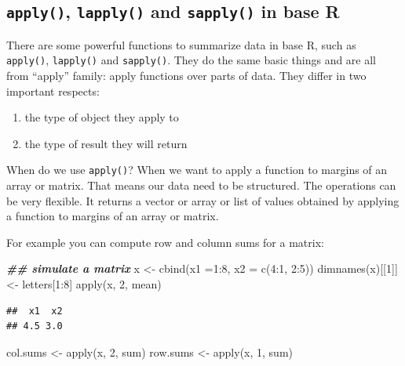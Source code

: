 \documentclass[
  12pt,
]{krantz}
\makeatletter
\newenvironment{Shaded}{\begin{snugshade}}{\end{snugshade}}
\newcommand{\AttributeTok}[1]{\textcolor[rgb]{0.61,0.61,0.61}{#1}}
\newcommand{\DecValTok}[1]{\textcolor[rgb]{0.06,0.06,0.06}{#1}}
\newcommand{\DocumentationTok}[1]{\textcolor[rgb]{0.37,0.37,0.37}{\textbf{\textit{#1}}}}
\newcommand{\FunctionTok}[1]{\textcolor[rgb]{0,0,0}{#1}}
\newcommand{\NormalTok}[1]{#1}
\newcommand{\OtherTok}[1]{\textcolor[rgb]{0.37,0.37,0.37}{#1}}
\newcommand{\SpecialCharTok}[1]{\textcolor[rgb]{0,0,0}{#1}}
\providecommand{\tightlist}{%
  \setlength{\itemsep}{0pt}\setlength{\parskip}{0pt}}
\newenvironment{kframe}{%
\medskip{}
\setlength{\fboxsep}{.8em}
 \def\at@end@of@kframe{}%
 \ifinner\ifhmode%
  \def\at@end@of@kframe{\end{minipage}}%
  \begin{minipage}{\columnwidth}%
 \fi\fi%
 \def\FrameCommand##1{\hskip\@totalleftmargin \hskip-\fboxsep
 \colorbox{shadecolor}{##1}\hskip-\fboxsep
     \hskip-\linewidth \hskip-\@totalleftmargin \hskip\columnwidth}%
 \MakeFramed {\advance\hsize-\width
   \@totalleftmargin\z@ \linewidth\hsize
   \@setminipage}}%
 {\par\unskip\endMakeFramed%
 \at@end@of@kframe}
\renewenvironment{Shaded}{\begin{kframe}}{\end{kframe}}
\makeatother
\begin{document}
\hypertarget{applyfamilyinbaser}{%
\subsection{\texorpdfstring{\texttt{apply()}, \texttt{lapply()} and \texttt{sapply()} in base R}{apply(), lapply() and sapply() in base R}}\label{applyfamilyinbaser}}

There are some powerful functions to summarize data in base R, such as \texttt{apply()}, \texttt{lapply()} and \texttt{sapply()}. They do the same basic things and are all from ``apply'' family: apply functions over parts of data. They differ in two important respects:

\begin{enumerate}
\def\labelenumi{\arabic{enumi}.}
\tightlist
\item
  the type of object they apply to
\item
  the type of result they will return
\end{enumerate}

When do we use \texttt{apply()}? When we want to apply a function to margins of an array or matrix. That means our data need to be structured. The operations can be very flexible. It returns a vector or array or list of values obtained by applying a function to margins of an array or matrix.

For example you can compute row and column sums for a matrix:

\begin{Shaded}
\begin{Highlighting}[]
\DocumentationTok{\#\# simulate a matrix}
\NormalTok{x }\OtherTok{\textless{}{-}} \FunctionTok{cbind}\NormalTok{(}\AttributeTok{x1 =}\DecValTok{1}\SpecialCharTok{:}\DecValTok{8}\NormalTok{, }\AttributeTok{x2 =} \FunctionTok{c}\NormalTok{(}\DecValTok{4}\SpecialCharTok{:}\DecValTok{1}\NormalTok{, }\DecValTok{2}\SpecialCharTok{:}\DecValTok{5}\NormalTok{))}
\FunctionTok{dimnames}\NormalTok{(x)[[}\DecValTok{1}\NormalTok{]] }\OtherTok{\textless{}{-}}\NormalTok{ letters[}\DecValTok{1}\SpecialCharTok{:}\DecValTok{8}\NormalTok{]}
\FunctionTok{apply}\NormalTok{(x, }\DecValTok{2}\NormalTok{, mean)}
\end{Highlighting}
\end{Shaded}

\begin{verbatim}
##  x1  x2 
## 4.5 3.0
\end{verbatim}

\begin{Shaded}
\begin{Highlighting}[]
\NormalTok{col.sums }\OtherTok{\textless{}{-}} \FunctionTok{apply}\NormalTok{(x, }\DecValTok{2}\NormalTok{, sum)}
\NormalTok{row.sums }\OtherTok{\textless{}{-}} \FunctionTok{apply}\NormalTok{(x, }\DecValTok{1}\NormalTok{, sum)}
\end{Highlighting}
\end{Shaded}
\end{document}
